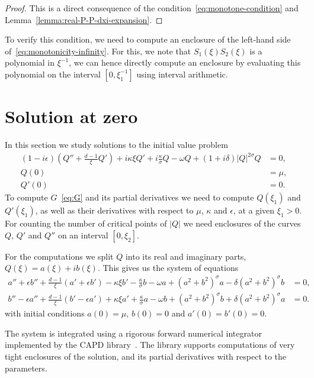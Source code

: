 \documentclass[11pt]{article}
\begin{document}
\begin{proof}
  This is a direct consequence of the
  condition~\eqref{eq:monotone-condition} and
  Lemma~\ref{lemma:real-P-P-dxi-expansion}.
\end{proof}

To verify this condition, we need to compute an enclosure of the
left-hand side of~\eqref{eq:monotonicity-infinity}. For this, we note
that \(S_{1}(\xi)S_{2}(\xi)\) is a polynomial in \(\xi^{-1}\), we can
hence directly compute an enclosure by evaluating this polynomial on
the interval \([0, \xi_{1}^{-1}]\) using interval arithmetic.

\section{Solution at zero}
\label{sec:solution-zero}
In this section we study solutions to the initial value problem
\begin{equation*}
  \begin{split}
    (1 - i\epsilon)\left(Q'' + \frac{d - 1}{\xi}Q'\right) + i\kappa\xi Q'
    + i \frac{\kappa}{\sigma}Q - \omega Q + (1 + i\delta)|Q|^{2\sigma}Q &= 0,\\
    Q(0) &= \mu,\\
    Q'(0) &= 0.
  \end{split}
\end{equation*}
To compute \(G\)~\eqref{eq:G} and its partial derivatives we need to
compute \(Q(\xi_1)\) and \(Q'(\xi_1)\), as well as their derivatives
with respect to \(\mu\), \(\kappa\) and \(\epsilon\), at a given
\(\xi_1 > 0\). For counting the number of critical points of \(|Q|\)
we need enclosures of the curves \(Q\), \(Q'\) and \(Q''\) on an
interval \([0, \xi_{2}]\).

For the computations we split \(Q\) into its real and imaginary parts,
\(Q(\xi) = a(\xi) + ib(\xi)\). This gives us the system of equations
\begin{align*}
  a'' + \epsilon b'' + \frac{d - 1}{\xi}(a' + \epsilon b') - \kappa \xi b' - \frac{\kappa}{\sigma}b - \omega a + (a^{2} + b^{2})^{\sigma}a - \delta(a^{2} + b^{2})^{\sigma}b &= 0,\\
  b'' - \epsilon a'' + \frac{d - 1}{\xi}(b' - \epsilon a') + \kappa \xi a' + \frac{\kappa}{\sigma}a - \omega b + (a^{2} + b^{2})^{\sigma}b + \delta(a^{2} + b^{2})^{\sigma}a &= 0.
\end{align*}
with initial conditions \(a(0) = \mu\), \(b(0) = 0\) and
\(a'(0) = b'(0) = 0\).

The system is integrated using a rigorous forward numerical integrator
implemented by the CAPD library~\cite{Kapela2021}. The library
supports computations of very tight enclosures of the solution, and
its partial derivatives with respect to the parameters.
\end{document}
